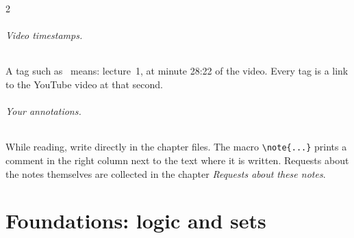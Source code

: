 \documentclass[12pt,oneside,openany]{book}
\begin{document}
\begin{paracol}{2}
\paragraph{Video timestamps.} A tag such as \ means: lecture~1, at minute 28:22 of the
video. Every tag is a link to the YouTube video at that second.

\paragraph{Your annotations.} While reading, write directly in the chapter files. The macro
\verb|\note{...}| prints a comment in the right column next to the text where it is written. Requests
about the notes themselves are collected in the chapter \emph{Requests about these notes}.

\flushside
\end{paracol}



\tableofcontents

\mainmatter
\part{Foundations: logic and sets}\label{part:foundations}





























\appendix

\end{document}
